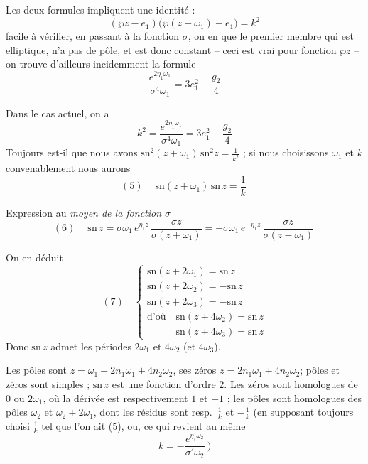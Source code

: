 \documentclass[11pt,a4paper]{article}
\begin{document}
Les deux formules impliquent une identité :
\[
(\wp z - e_1)\bigl(\wp(z-\omega_1) - e_1\bigr) = k^2
\]
facile à vérifier, en passant à la fonction $\sigma$, on en  que
le premier membre qui est elliptique, n'a pas de pôle, et est donc constant --
ceci est vrai pour  fonction $\wp z$ -- on trouve d'ailleurs
incidemment la formule
\[
\frac{e^{2\eta_1\omega_1}}{\sigma^4\omega_1} = 3e_1^2 - \frac{g_2}{4}
\]

Dans le cas actuel, on a
\[
k^2 = \frac{e^{2\eta_1\omega_1}}{\sigma^4\omega_1} = 3e_1^2 - \frac{g_2}{4}
\]
Toujours est-il que nous avons $\mathrm{sn}^2(z+\omega_1)\,\mathrm{sn}^2 z =
\frac{1}{k^2}$ ; si nous choisissons $\omega_1$ et $k$
convenablement nous aurons
\[
(5)\quad \boxed{\ \mathrm{sn}(z+\omega_1)\,\mathrm{sn}\,z = \frac{1}{k}\ }
\]

Expression au \emph{moyen de la fonction $\sigma$}
\[
(6)\quad \boxed{\ \mathrm{sn}\,z = \sigma\omega_1\, e^{\eta_1 z}\,
\frac{\sigma z}{\sigma(z+\omega_1)}
= -\sigma\omega_1\, e^{-\eta_1 z}\,\frac{\sigma z}{\sigma(z-\omega_1)}\ }
\]

On en déduit
\[
(7)\quad
\left\lbrace
\begin{array}{l}
\mathrm{sn}(z+2\omega_1) = \mathrm{sn}\,z\\
\mathrm{sn}(z+2\omega_2) = -\mathrm{sn}\,z\\
\mathrm{sn}(z+2\omega_3) = -\mathrm{sn}\,z\\[4pt]
\text{d'où}\quad \mathrm{sn}(z+4\omega_2) = \mathrm{sn}\,z\\
\phantom{\text{d'où}}\quad \mathrm{sn}(z+4\omega_3) = \mathrm{sn}\,z
\end{array}
\right.
\]
Donc $\mathrm{sn}\,z$ admet les périodes $2\omega_1$ et $4\omega_2$ (et
$4\omega_3$).

Les pôles sont $z = \omega_1 + 2n_1\omega_1 + 4n_2\omega_2$, ses zéros
$z = 2n_1\omega_1 + 4n_2\omega_2$; 
pôles et zéros sont simples ; $\mathrm{sn}\,z$ est une fonction d'ordre $2$. Les
zéros sont homologues de $0$ ou $2\omega_1$, où la dérivée est respectivement $1$ et
$-1$ ; les pôles sont homologues des pôles $\omega_2$ et $\omega_2+2\omega_1$, dont
les résidus sont resp.\ $\frac{1}{k}$ et $-\frac{1}{k}$ (en supposant toujours
choisi  $\frac{1}{k}$ tel que l'on ait (5), ou, ce qui revient au
même
\[
k = -\frac{e^{\eta_1\omega_2}}{\sigma'\omega_2}\ \Bigr)
\]
\end{document}
